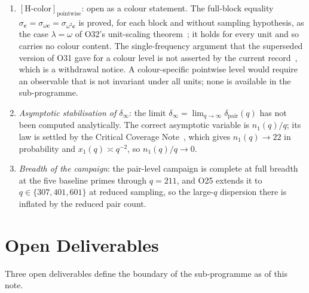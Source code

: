 \documentclass[11pt,a4paper]{article}
\theoremstyle{definition}
\newcommand{\dimpair}{\delta_{\mathrm{pair}}}
\begin{document}
      \begin{enumerate}
        \item \textit{$[\mathrm{H\text{-}color}]_{\mathrm{pointwise}}$}: open as a colour statement.
        The full-block equality $\sigma_{\mathbf c}=\sigma_{\omega\mathbf c}=\sigma_{\omega^2\mathbf c}$
        is proved, for each block and without sampling hypothesis, as the case $\lambda=\omega$ of
        O32's unit-scaling theorem~\cite{Beau2026a36}; it holds for every unit and so carries no
        colour content.
        The single-frequency argument that the superseded version of O31 gave for a colour level is
        not asserted by the current record~\cite{Beau2026a35}, which is a withdrawal notice.
        A colour-specific pointwise level would require an observable that is not invariant under
        all units; none is available in the sub-programme.

        \item \textit{Asymptotic stabilisation of $\delta_\infty$}: the limit
        $\delta_\infty = \lim_{q \to \infty} \dimpair(q)$ has not been computed analytically.
        The correct asymptotic variable is $n_1(q)/q$; its law is settled by the Critical Coverage
        Note~\cite{Beau2026ccnote}, which gives $n_1(q) \to 22$ in probability and
        $x_1(q) \asymp q^{-2}$, so $n_1(q)/q \to 0$.

        \item \textit{Breadth of the campaign}: the pair-level campaign is complete at full
        breadth at the five baseline primes through $q = 211$, and O25 extends it to
        $q \in \{307, 401, 601\}$ at reduced sampling, so the large-$q$ dispersion there is
        inflated by the reduced pair count.
      \end{enumerate}

  \section{Open Deliverables}
    \label{sec:open}

    Three open deliverables define the boundary of the sub-programme as of this note.
\end{document}
